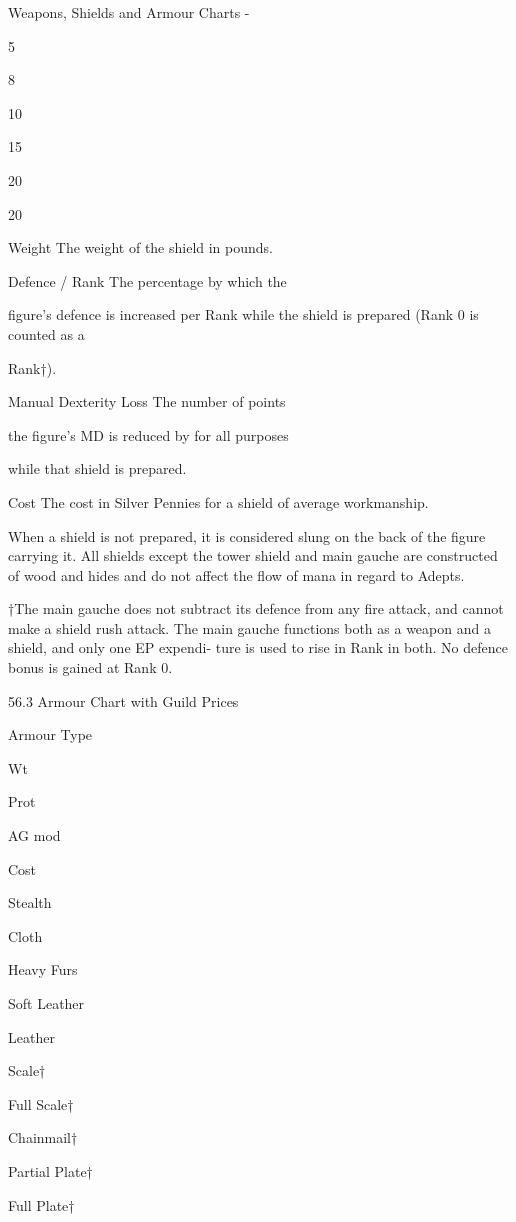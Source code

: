 \begin{Table}{Weapons, Shields and Armour Charts}
- 

5 

8 

10 

15 

20 

20 

 
Weight The weight of the shield in pounds. 
 
Defence  /  Rank  The  percentage  by  which  the 
 
figure’s defence is increased per Rank while the 
shield  is  prepared  (Rank  0  is  counted  as  a 
 
Rank†). 
 
Manual  Dexterity  Loss  The  number  of  points 
 
the  figure’s  MD  is  reduced  by  for  all  purposes 
 
while that shield is prepared. 

 
Cost  The  cost  in  Silver  Pennies  for  a  shield  of 
average workmanship. 
 

When  a  shield  is  not  prepared,  it  is  considered 
slung  on  the  back  of  the  figure  carrying  it.  All 
shields except the tower shield and main gauche 
are  constructed  of  wood  and  hides  and  do  not 
affect the flow of mana in regard to Adepts. 

†The  main  gauche  does  not  subtract  its  defence 
from  any  fire  attack,  and  cannot  make  a  shield 
rush attack. The main gauche functions both as a 
weapon  and  a  shield,  and  only  one  EP  expendi-
ture  is  used  to  rise  in  Rank  in  both.  No  defence 
bonus is gained at Rank 0. 

56.3 Armour Chart with Guild Prices 

 

Armour Type 

Wt 

Prot 

AG mod 

Cost 

Stealth 

Cloth 

Heavy Furs 

Soft Leather 

Leather 

Scale† 

Full Scale† 

Chainmail† 

Partial Plate† 

Full Plate† 


\end{Table}
